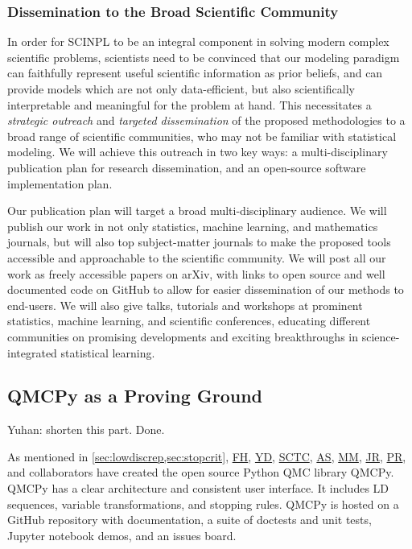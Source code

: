 \documentclass[11pt]{NSFamsart}
\newcommand{\cmtS}[1]{{\color{blue}{(Simon: #1)}}}
\newcommand{\FH}{\hyperlink{FHlink}{FH}\xspace}
\newcommand{\SCTC}{\hyperlink{SCTClink}{SCTC}\xspace}
\newcommand{\MM}{\hyperlink{MMlink}{MM}\xspace}
\newcommand{\YD}{\hyperlink{YDlink}{YD}\xspace}
\newcommand{\JR}{\hyperlink{JRlink}{JR}\xspace}
\newcommand{\AS}{\hyperlink{ASlink}{AS}\xspace}
\newcommand{\PR}{\hyperlink{PRlink}{PR}\xspace}
\newcommand{\QMCPy}{QMCPy\xspace}
\newcommand{\YDNote}[1]{{\color{magenta}Yuhan: #1}}
\begin{document}
\subsubsection*{Dissemination to the Broad Scientific Community}
In order for SCINPL to be an integral component in solving modern complex scientific problems, scientists need to be convinced that our modeling paradigm can faithfully represent useful scientific information as prior beliefs, and can provide models which are not only data-efficient, but also scientifically interpretable and meaningful for the problem at hand. This necessitates a \textit{strategic outreach} and \textit{targeted dissemination} of the proposed methodologies to a broad range of scientific communities, who may not be familiar with statistical modeling. We will achieve this outreach in two key ways: a multi-disciplinary publication plan for research dissemination, and an open-source software implementation plan. 

Our publication plan will target a broad multi-disciplinary audience. We will publish our work in not only statistics, machine learning, and mathematics journals, but will also top subject-matter journals to make the proposed tools accessible and approachable to the scientific community. We will post all our work as freely accessible papers on arXiv, with links to open source and well documented code on GitHub to allow for easier dissemination of our methods to end-users. We will also give talks, tutorials and workshops at prominent statistics, machine learning, and scientific conferences, educating different communities on promising developments and exciting breakthroughs in science-integrated statistical learning.


\subsection{QMCPy as a Proving Ground} \label{sec:provingground}
\cmtS{Fred \& Yuhan: maybe shorten the writing below, and focus on QMCPy as a vessel for connecting our new methods (\& existing state-of-the-art) to scientific practitioners who will use such tools for cost-efficient solutions to cutting-edge scientific problems.} \YDNote{shorten this part. Done.}  

As mentioned in \cref{sec:lowdiscrep,sec:stopcrit}, \FH, \YD, \SCTC, \AS, \MM, \JR, \PR, and collaborators have created the open source Python QMC library \QMCPy.  \QMCPy has a clear architecture and consistent user interface. It includes LD sequences,  variable transformations, and stopping rules.  \QMCPy is hosted on a GitHub repository with documentation, a suite of doctests and unit tests, Jupyter notebook demos, and an issues board.
\end{document}

